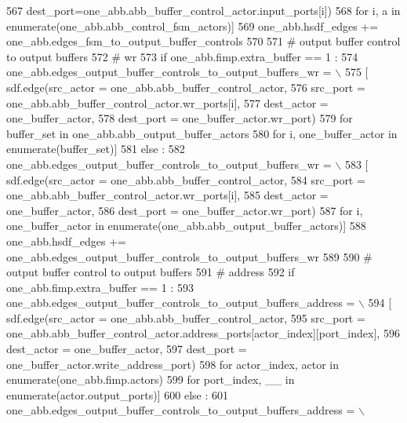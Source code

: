 \begin{DoxyCode}
567                   dest\_port=one\_abb.abb\_buffer\_control\_actor.input\_ports[i])
568          \textcolor{keywordflow}{for} i, a \textcolor{keywordflow}{in} enumerate(one\_abb.abb\_control\_fsm\_actors)]
569     one\_abb.hsdf\_edges += one\_abb.edges\_fsm\_to\_output\_buffer\_controls
570 
571     \textcolor{comment}{# output buffer control to output buffers}
572     \textcolor{comment}{# wr}
573     \textcolor{keywordflow}{if} one\_abb.fimp.extra\_buffer == 1 :
574       one\_abb.edges\_output\_buffer\_controls\_to\_output\_buffers\_wr = \(\backslash\)
575         [ sdf.edge(src\_actor = one\_abb.abb\_buffer\_control\_actor,
576             src\_port = one\_abb.abb\_buffer\_control\_actor.wr\_ports[i],
577             dest\_actor = one\_buffer\_actor,
578             dest\_port = one\_buffer\_actor.wr\_port)
579          \textcolor{keywordflow}{for} buffer\_set \textcolor{keywordflow}{in} one\_abb.abb\_output\_buffer\_actors
580          \textcolor{keywordflow}{for} i, one\_buffer\_actor \textcolor{keywordflow}{in} enumerate(buffer\_set)]
581     \textcolor{keywordflow}{else} :
582       one\_abb.edges\_output\_buffer\_controls\_to\_output\_buffers\_wr = \(\backslash\)
583         [ sdf.edge(src\_actor = one\_abb.abb\_buffer\_control\_actor,
584             src\_port = one\_abb.abb\_buffer\_control\_actor.wr\_ports[i],
585             dest\_actor = one\_buffer\_actor,
586             dest\_port = one\_buffer\_actor.wr\_port)
587          \textcolor{keywordflow}{for} i, one\_buffer\_actor \textcolor{keywordflow}{in} enumerate(one\_abb.abb\_output\_buffer\_actors)]
588     one\_abb.hsdf\_edges += one\_abb.edges\_output\_buffer\_controls\_to\_output\_buffers\_wr
589 
590     \textcolor{comment}{# output buffer control to output buffers}
591     \textcolor{comment}{# address}
592     \textcolor{keywordflow}{if} one\_abb.fimp.extra\_buffer == 1 :
593       one\_abb.edges\_output\_buffer\_controls\_to\_output\_buffers\_address = \(\backslash\)
594         [ sdf.edge(src\_actor = one\_abb.abb\_buffer\_control\_actor,
595             src\_port = one\_abb.abb\_buffer\_control\_actor.address\_ports[actor\_index][port\_index],
596             dest\_actor = one\_buffer\_actor,
597             dest\_port = one\_buffer\_actor.write\_address\_port)
598          \textcolor{keywordflow}{for} actor\_index, actor \textcolor{keywordflow}{in} enumerate(one\_abb.fimp.actors)
599          \textcolor{keywordflow}{for} port\_index, \_\_ \textcolor{keywordflow}{in} enumerate(actor.output\_ports)]
600     \textcolor{keywordflow}{else} :
601       one\_abb.edges\_output\_buffer\_controls\_to\_output\_buffers\_address = \(\backslash\)

\end{DoxyCode}
